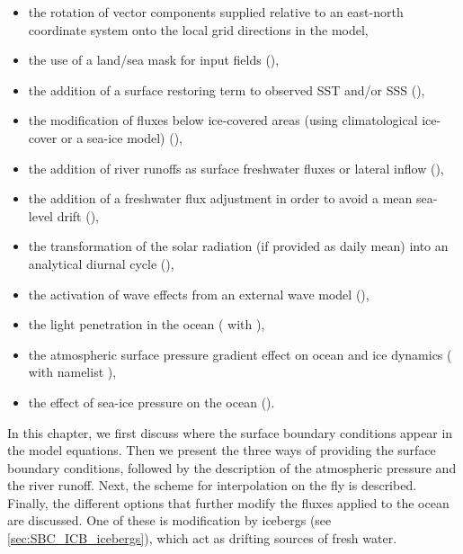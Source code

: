 \documentclass[../main/NEMO_manual]{subfiles}
\begin{document}
\begin{itemize}
\item the rotation of vector components supplied relative to an east-north coordinate system onto
  the local grid directions in the model,
\item the use of a land/sea mask for input fields (),
\item the addition of a surface restoring term to observed SST and/or SSS (),
\item the modification of fluxes below ice-covered areas (using climatological ice-cover or a sea-ice model)
  (),
\item the addition of river runoffs as surface freshwater fluxes or lateral inflow (),
\item the addition of a freshwater flux adjustment in order to avoid a mean sea-level drift
  (),
\item the transformation of the solar radiation (if provided as daily mean) into an analytical diurnal cycle
  (),
\item the activation of wave effects from an external wave model  (),
\item the light penetration in the ocean ( with ),
\item the atmospheric surface pressure gradient effect on ocean and ice dynamics ( with namelist ),
\item the effect of sea-ice pressure on the ocean ().
\end{itemize}

In this chapter, we first discuss where the surface boundary conditions appear in the model equations.
Then we present the three ways of providing the surface boundary conditions,
followed by the description of the atmospheric pressure and the river runoff.
Next, the scheme for interpolation on the fly is described.
Finally, the different options that further modify the fluxes applied to the ocean are discussed.
One of these is modification by icebergs (see \autoref{sec:SBC_ICB_icebergs}),
which act as drifting sources of fresh water.

\end{document}
